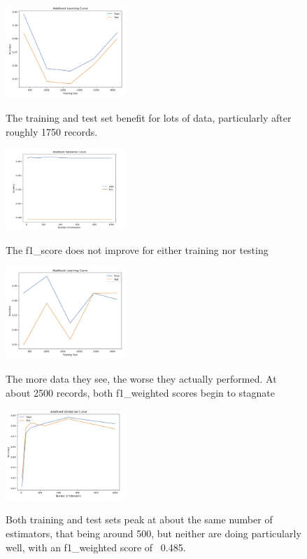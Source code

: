 \documentclass[conference]{IEEEtran}
\begin{document}
\begin{figure}[H]
    \centering
    \includegraphics[width=0.40\textwidth]{Red Wine Quality Graph Images/Adaboost/ada lc init.png}
    \label{fig:enter-label}
    \caption{The training and test set benefit for lots of data, particularly after roughly 1750 records.}
\end{figure}

\begin{figure}[H]
    \centering
    \includegraphics[width=0.40\textwidth]{Red Wine Quality Graph Images/Adaboost/ada vc init.png}
    \label{fig:enter-label}
    \caption{The f1\_score does not improve for either training nor testing}
\end{figure}

\begin{figure}[H]
    \centering
    \includegraphics[width=0.40\textwidth]{Red Wine Quality Graph Images/Adaboost/ada lc final.png}
    \label{fig:enter-label}
    \caption{The more data they see, the worse they actually performed. At about 2500 records, both f1\_weighted scores begin to stagnate}
\end{figure}

\begin{figure}[H]
    \centering
    \includegraphics[width=0.40\textwidth]{Red Wine Quality Graph Images/Adaboost/ada vc final.png}
    \label{fig:enter-label}
    \caption{Both training and test sets peak at about the same number of estimators, that being around 500, but neither are doing particularly well, with an f1\_weighted score of ~0.485.}
\end{figure}
\end{document}
